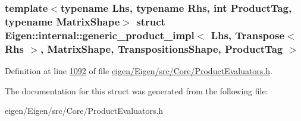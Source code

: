 \subsubsection*{template$<$typename Lhs, typename Rhs, int Product\+Tag, typename Matrix\+Shape$>$\newline
struct Eigen\+::internal\+::generic\+\_\+product\+\_\+impl$<$ Lhs, Transpose$<$ Rhs $>$, Matrix\+Shape, Transpositions\+Shape, Product\+Tag $>$}



Definition at line \hyperlink{eigen_2_eigen_2src_2_core_2_product_evaluators_8h_source_l01092}{1092} of file \hyperlink{eigen_2_eigen_2src_2_core_2_product_evaluators_8h_source}{eigen/\+Eigen/src/\+Core/\+Product\+Evaluators.\+h}.



The documentation for this struct was generated from the following file\+:\begin{DoxyCompactItemize}
\item 
eigen/\+Eigen/src/\+Core/\+Product\+Evaluators.\+h\end{DoxyCompactItemize}
